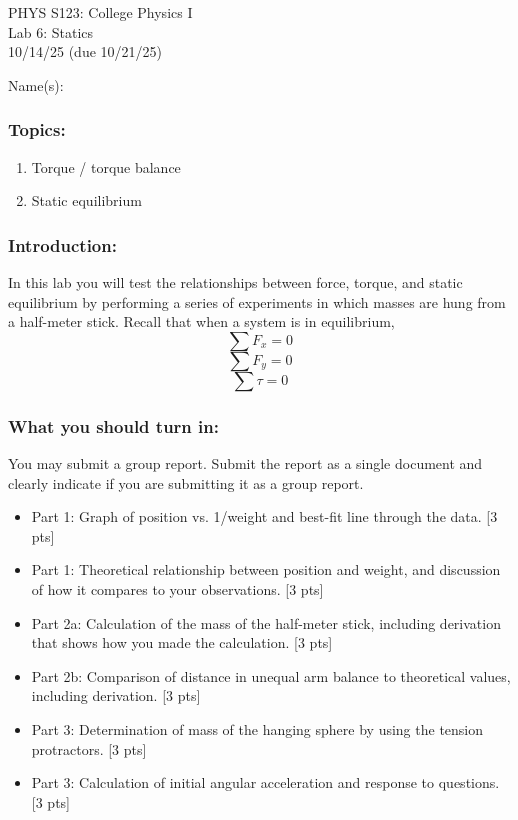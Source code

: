 \documentclass[11pt,letterpaper]{article}
\newcounter{question}[section]
\begin{document}
\setlength{\parindent}{0in}


\begin{flushright}
PHYS S123: College Physics I\\
Lab 6: Statics\\
10/14/25 (due 10/21/25)
\end{flushright}

Name(s):\\

\subsubsection*{Topics:}
\begin{enumerate}
\setlength{\parskip}{3pt}
\item Torque / torque balance
\item Static equilibrium
\end{enumerate}

\subsubsection*{Introduction:}
In this lab you will test the relationships between force, torque, and static equilibrium by performing a series of experiments in which masses are hung from a half-meter stick. Recall that when a system is in equilibrium,
$$\sum{F_x}=0$$
$$\sum{F_y}=0$$
$$\sum\tau=0$$

\subsubsection*{What you should turn in:} 
You may submit a group report. Submit the report as a single document and clearly indicate if you are submitting it as a group report. 

\begin{itemize}
\setlength{\parskip}{3pt}
\item Part 1: Graph of position vs. 1/weight and best-fit line through the data. [3 pts]
\item Part 1: Theoretical relationship between position and weight, and discussion of how it compares to your observations. [3 pts]
\item Part 2a: Calculation of the mass of the half-meter stick, including derivation that shows how you made the calculation. [3 pts]
\item Part 2b: Comparison of distance in unequal arm balance to theoretical values, including derivation. [3 pts]
\item Part 3: Determination of mass of the hanging sphere by using the tension protractors. [3 pts]
\item Part 3: Calculation of initial angular acceleration and response to questions. [3 pts]
\end{itemize}
\end{document}
